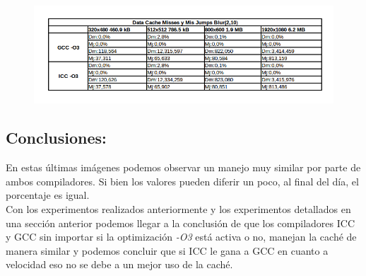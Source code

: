\begin{figure}[H]
\begin{center}
  \includegraphics[width=\linewidth]{cachecompiladores/blur210cache.png}
\end{center}
\end{figure}

\subsection{Conclusiones:}
En estas últimas imágenes podemos observar un manejo muy similar por parte de ambos compiladores. Si bien los valores pueden diferir un poco, al final del día, el porcentaje es igual.\\
Con los experimentos realizados anteriormente y los experimentos detallados en una sección anterior podemos llegar a la conclusión de que los compiladores ICC y GCC sin importar si la optimización \textit{-O3} está activa o no, manejan la caché de manera similar y podemos concluir que si ICC le gana a GCC en cuanto a velocidad eso no se debe a un mejor uso de la caché.

